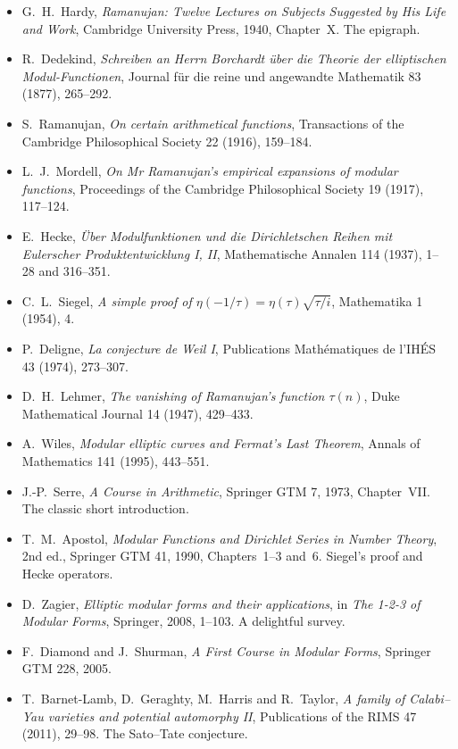 \begin{itemize}
\item G.~H.~Hardy, \emph{Ramanujan: Twelve Lectures on Subjects Suggested by His Life and Work}, Cambridge University Press, 1940, Chapter~X. The epigraph.
\item R.~Dedekind, \emph{Schreiben an Herrn Borchardt über die Theorie der elliptischen Modul-Functionen}, Journal für die reine und angewandte Mathematik 83 (1877), 265--292.
\item S.~Ramanujan, \emph{On certain arithmetical functions}, Transactions of the Cambridge Philosophical Society 22 (1916), 159--184.
\item L.~J.~Mordell, \emph{On Mr Ramanujan's empirical expansions of modular functions}, Proceedings of the Cambridge Philosophical Society 19 (1917), 117--124.
\item E.~Hecke, \emph{Über Modulfunktionen und die Dirichletschen Reihen mit Eulerscher Produktentwicklung I, II}, Mathematische Annalen 114 (1937), 1--28 and 316--351.
\item C.~L.~Siegel, \emph{A simple proof of $\eta(-1/\tau)=\eta(\tau)\sqrt{\tau/i}$}, Mathematika 1 (1954), 4.
\item P.~Deligne, \emph{La conjecture de Weil I}, Publications Mathématiques de l'IHÉS 43 (1974), 273--307.
\item D.~H.~Lehmer, \emph{The vanishing of Ramanujan's function $\tau(n)$}, Duke Mathematical Journal 14 (1947), 429--433.
\item A.~Wiles, \emph{Modular elliptic curves and Fermat's Last Theorem}, Annals of Mathematics 141 (1995), 443--551.
\item J.-P.~Serre, \emph{A Course in Arithmetic}, Springer GTM 7, 1973, Chapter~VII. The classic short introduction.
\item T.~M.~Apostol, \emph{Modular Functions and Dirichlet Series in Number Theory}, 2nd ed., Springer GTM 41, 1990, Chapters~1--3 and~6. Siegel's proof and Hecke operators.
\item D.~Zagier, \emph{Elliptic modular forms and their applications}, in \emph{The 1-2-3 of Modular Forms}, Springer, 2008, 1--103. A delightful survey.
\item F.~Diamond and J.~Shurman, \emph{A First Course in Modular Forms}, Springer GTM 228, 2005.
\item T.~Barnet-Lamb, D.~Geraghty, M.~Harris and R.~Taylor, \emph{A family of Calabi--Yau varieties and potential automorphy II}, Publications of the RIMS 47 (2011), 29--98. The Sato--Tate conjecture.
\end{itemize}

